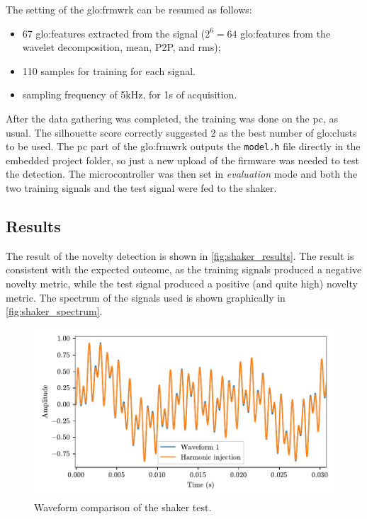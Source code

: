 The setting of the \gls{glo:frmwrk} can be resumed as follows:
\begin{itemize}
    \item 67 \gls{glo:feature}s extracted from the signal ($2^6=64$ \gls{glo:feature}s from the wavelet decomposition, mean, P2P, and \gls{rms});
    \item 110 samples for training for each signal.
    \item sampling frequency of 5kHz, for 1s of acquisition.
\end{itemize}

After the data gathering was completed, the training was done on the \gls{pc}, as usual. The silhouette score correctly suggested 2 as the best number of \gls{glo:clust}s to be used. The \gls{pc} part of the \gls{glo:frmwrk} outputs the \texttt{model.h} file directly in the embedded project folder, so just a new upload of the firmware was needed to test the detection. The microcontroller was then set in \emph{evaluation} mode and both the two training signals and the test signal were fed to the shaker. 

\subsection{Results}
The result of the novelty detection is shown in \autoref{fig:shaker_results}. The result is consistent with the expected outcome, as the training signals produced a negative novelty metric, while the test signal produced a positive (and quite high) novelty metric. The spectrum of the signals used is shown graphically in \autoref{fig:shaker_spectrum}.

\begin{figure}
    \centering
    \includegraphics{Images/shaker/Figure_1.pdf}
    \caption{Waveform comparison of the shaker test.}
    \label{fig:shaker}
\end{figure}


